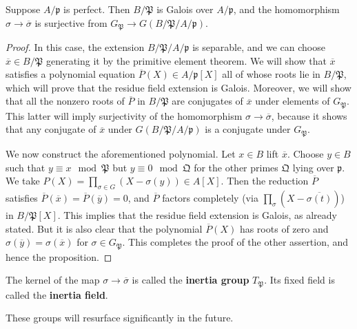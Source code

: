 \begin{proposition} Suppose $A/\mathfrak{p}$ is perfect. Then $B/\mathfrak{P}$ is Galois over $A/\mathfrak{p}$, and the homomorphism $\sigma \to \overline{\sigma}$ is surjective from $G_{\mathfrak{P}} \to G(B/\mathfrak{P}/A/\mathfrak{p})$.
\end{proposition}
\begin{proof}
In this case, the extension $B/\mathfrak{P}/A/\mathfrak{p}$ is separable, and we can choose $\overline{x} \in B/\mathfrak{P}$ generating it by the primitive element theorem.  We will show that $\overline{x}$ satisfies a polynomial equation  $\overline{P}(X) \in A/\mathfrak{p}[X]$ all of whose roots lie in $B/\mathfrak{P}$, which will prove that the residue field extension is Galois.  Moreover, we will show that all the nonzero roots of $\overline{P}$ in $B/\mathfrak{P}$ are conjugates of $\overline{x}$ under elements of $G_{\mathfrak{P}}$.  This latter will imply surjectivity of the homomorphism $\sigma \to \overline{\sigma}$, because it shows that any conjugate of $\overline{x}$ under $G(B/\mathfrak{P}/A/\mathfrak{p})$ is a conjugate under $G_{\mathfrak{P}}$.

We now construct the aforementioned polynomial.   Let $x \in B$ lift $\overline{x}$.  Choose $y \in B$ such that $y \equiv x \mod \mathfrak{P}$ but $y \equiv 0 \mod \mathfrak{Q}$ for the other primes $\mathfrak{Q}$ lying over $\mathfrak{p}$.  We take $P(X) = \prod_{\sigma \in G} (X - \sigma(y)) \in A[X]$. Then the reduction $\overline{P}$ satisfies $\overline{P}(\overline{x})= \overline{P}(\overline{y}) = 0$, and $\overline{P}$ factors completely (via $\prod_{\sigma} (X - \overline{\sigma(t)})$) in $B/\mathfrak{P}[X]$.  This implies that the residue field extension is Galois, as already stated. 
But it is also clear that the polynomial $\overline{P}(X)$ has roots of zero and $\sigma(\overline{y}) = \sigma(\overline{x})$ for $\sigma \in G_{\mathfrak{P}}$.  This completes the proof of the other assertion, and hence the proposition.
\end{proof}

\begin{definition} 
The kernel of the map $\sigma \to \overline{\sigma}$ is called the \textbf{inertia
group} $T_{\mathfrak{P}}$.  Its fixed field is called the \textbf{inertia
field}.
\end{definition}

These groups will resurface significantly in the future.


